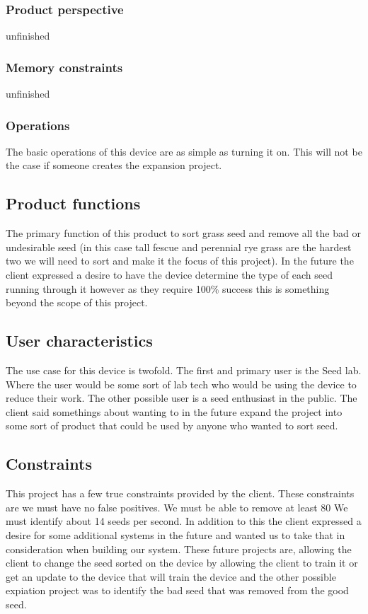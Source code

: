 \documentclass[onecolumn, draftclsnofoot,10pt, compsoc]{IEEEtran}
\begin{document}
\subsubsection{Product perspective}
unfinished

\subsubsection{Memory constraints}
unfinished
\subsubsection{Operations}
The basic operations of this device are as simple as turning it on.
This will not be the case if someone creates the expansion project.


\subsection{Product functions}
The primary function of this product to sort grass seed and remove all the bad or undesirable seed (in this case tall fescue and perennial rye grass are the hardest two we will need to sort and make it the focus of this project).
In the future the client expressed a desire to have the device determine the type of each seed running through it however as they require 100\% success this is something beyond the scope of this project.

\subsection{User characteristics}
The use case for this device is twofold.
The first and primary user is the Seed lab.
Where the user would be some sort of lab tech who would be using the device to reduce their work.
The other possible user is a seed enthusiast in the public.
The client said somethings about wanting to in the future expand the project into some sort of product that could be used by anyone who wanted to sort seed.

\subsection{Constraints}
This project has a few true constraints provided by the client.
These constraints are we must have no false positives. We must be able to remove at least 80%
We must identify about 14 seeds per second.
In addition to this the client expressed a desire for some additional systems in the future and wanted us to take that in consideration when building our system.
These future projects are, allowing the client to change the seed sorted on the device by allowing the client to train it or get an update to the device that will train the device and the other possible expiation project was to identify the bad seed that was removed from the good seed.
\end{document}
